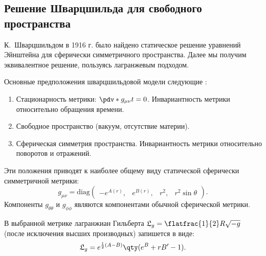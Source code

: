 \documentclass[\docroot/reports/draft/report.tex]{subfiles}
\begin{document}
\onlyinsubfile{\tableofcontents}

\subsection{Решение Шварцшильда для свободного пространства}

    К.~Шварцшильдом в 1916 г. \cite{schwarzschild_free_space_rus}\footnotemark{} было найдено статическое решение уравнений Эйнштейна для сферически симметричного пространства. Далее мы получим эквивалентное решение, пользуясь лагранжевым подходом.


    Основные предположения шварцшильдовой модели следующие \cite{schwarzschild_free_space_rus}:
    \begin{enumerate}
        \item Стационарность метрики: $\pdv*{g_{\mu\nu}}{t} = 0$. Инвариантность метрики относительно обращения времени.
        \item Свободное пространство (вакуум, отсутствие материи).
        \item Сферическая симметрия пространства. Инвариантность метрики относительно поворотов и отражений.
    \end{enumerate}
    Эти положения приводят к наиболее общему виду статической сферически симметричной метрики:
    \begin{equation*}
        g_{\mu\nu} = \text{diag} \begin{pmatrix}
            -e^{A(r)},& e^{B(r)},& r^2,& r^2 \sin\theta
        \end{pmatrix} .
    \end{equation*}
    Компоненты $g_{\theta\theta}$ и $g_{\phi\phi}$ являются компонентами обычной сферической метрики.

    В выбранной метрике лагранжиан Гильберта $\mathfrak{L}_g = \flatfrac{1}{2} R \sqrt{-g}$ (после исключения высших производных) запишется в виде:
    \begin{equation*}
        \mathfrak{L}_g = e^{\frac{1}{2} (A - B)} \qty(e^B + r B' - 1) .
    \end{equation*}
\end{document}
